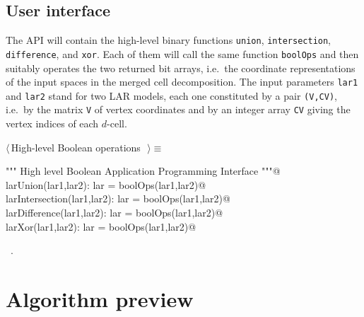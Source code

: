 \documentclass[11pt,oneside]{article}	%
\begin{document}
\subsection{User interface}

The API will contain the high-level binary functions \texttt{union}, \texttt{intersection}, \texttt{difference}, and \texttt{xor}. Each of them will call the same function \texttt{boolOps} and then suitably operates the two returned bit arrays, i.e.~the coordinate representations of the input spaces in the merged cell decomposition. The input parameters \texttt{lar1} and  \texttt{lar2} stand for two LAR models, each one constituted by a pair \texttt{(V,CV)}, i.e.~by the matrix \texttt{V} of vertex coordinates and by an integer array \texttt{CV} giving the vertex indices of each $d$-cell.

\begin{flushleft} \small \label{scrap1}
$\langle\,$High-level Boolean operations\nobreak\ {\footnotesize {}}$\,\rangle\equiv$
\vspace{-1ex}
\begin{list}{}{} \item
\mbox{}\verb@""" High level Boolean Application Programming Interface """@\\
\mbox{}\verb@def larUnion(lar1,lar2): lar = boolOps(lar1,lar2)@\\
\mbox{}\verb@def larIntersection(lar1,lar2): lar = boolOps(lar1,lar2)@\\
\mbox{}\verb@def larDifference(lar1,lar2): lar = boolOps(lar1,lar2)@\\
\mbox{}\verb@def larXor(lar1,lar2): lar = boolOps(lar1,lar2)@\\
\mbox{}\verb@@{\NWsep}
\end{list}
\vspace{-1ex}
\footnotesize\addtolength{\baselineskip}{-1ex}
\begin{list}{}{\setlength{\itemsep}{-\parsep}\setlength{\itemindent}{-\leftmargin}}
\item \NWtxtMacroRefIn\ .
\end{list}
\end{flushleft}


\section{Algorithm preview}
\end{document}
